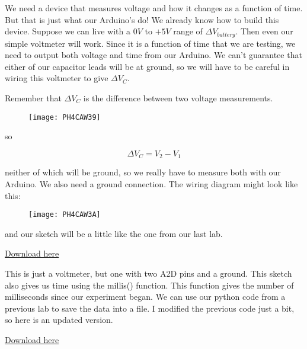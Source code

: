 We need a device that measures voltage and how it changes as a function of time. But that is just what our Arduino's do! We already know how to build this device. Suppose we can live with a $0\unit{V}$ to $+5\unit{V}$ range of $\Delta V_{battery}.$ Then even our simple voltmeter will work. Since it is a function of time that we are testing, we need to output both voltage and time from our Arduino. We can't guarantee that either of our capacitor leads will be at ground, so we will have to be careful in wiring this voltmeter to give $\Delta V_{C}.$

Remember that $\Delta V_{C}$ is the difference between two voltage
measurements. 

\begin{figure}[h!]
	\centering
	\texttt{[image: PH4CAW39]}
\end{figure}

\noindent so 

\begin{equation*}
	\Delta V_{C}=V_{2}-V_{1}
\end{equation*}

neither of which will be ground, so we really have to measure both with our Arduino. We also need a ground connection. The wiring diagram might look like this:

\begin{figure}[h!]
	\centering
	\texttt{[image: PH4CAW3A]}
\end{figure}

\noindent and our sketch will be a little
like the one from our last lab.

\href{https://raw.githubusercontent.com/rtlines/IntermediateLabPH250/main/Code/RC_Volts_vsTime.ino}{Download here}


This is just a voltmeter, but one with two A2D pins and a ground. This sketch also gives us time using the millis() function. This function gives the number of milliseconds since our experiment began. We can use our python code from a previous lab to save the data into a file. I modified the previous code just a bit, so here is an updated version.

\href{https://raw.githubusercontent.com/rtlines/IntermediateLabPH250/main/Code/RC_ReadSaveFile.py}{Download here}


